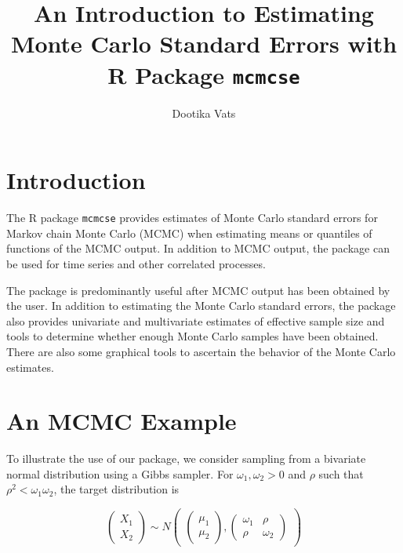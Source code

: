 \documentclass[11pt]{article}\usepackage[]{graphicx}\usepackage[]{color}
\title{An Introduction to Estimating Monte Carlo Standard Errors with R Package \texttt{mcmcse} }
\author{Dootika Vats}
\begin{document}
\maketitle
\setlength\parindent{0pt}
\tableofcontents

\break
\section{Introduction}
The R package \texttt{mcmcse} provides estimates of Monte Carlo standard errors for Markov chain Monte Carlo (MCMC) when estimating means or quantiles of functions of the MCMC output. In addition to MCMC output, the package can be used for time series and other correlated processes. 

The package is predominantly useful after MCMC output has been obtained by the user. In addition to estimating the Monte Carlo standard errors, the package also provides univariate and multivariate estimates of effective sample size and tools to determine whether enough Monte Carlo samples have been obtained. There are also some graphical tools to ascertain the behavior of the Monte Carlo estimates.



\bigskip
\section{An MCMC Example}

To illustrate the use of our package, we consider sampling from a bivariate normal distribution using a Gibbs sampler. For $\omega_1, \omega_2 > 0$ and  $\rho$ such that $\rho^2 < \omega_1 \omega_2$, the target distribution is 

\[
\left(\begin{array}{c}
  X_1 \\ X_2
\end{array} \right) \sim 
 N \begin{pmatrix}
\begin{pmatrix}
\mu_{1}\\
\mu_{2}
\end{pmatrix}, 
\begin{pmatrix}
\omega_1 & \rho \\
\rho & \omega_2
\end{pmatrix}
\end{pmatrix}
\]
\end{document}
